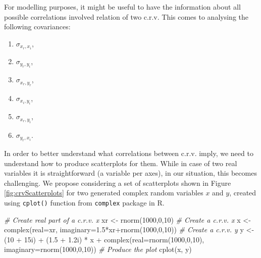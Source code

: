 \documentclass[
]{book}
\newenvironment{Shaded}{\begin{snugshade}}{\end{snugshade}}
\newcommand{\AttributeTok}[1]{\textcolor[rgb]{0.77,0.63,0.00}{#1}}
\newcommand{\CommentTok}[1]{\textcolor[rgb]{0.56,0.35,0.01}{\textit{#1}}}
\newcommand{\DecValTok}[1]{\textcolor[rgb]{0.00,0.00,0.81}{#1}}
\newcommand{\FloatTok}[1]{\textcolor[rgb]{0.00,0.00,0.81}{#1}}
\newcommand{\FunctionTok}[1]{\textcolor[rgb]{0.00,0.00,0.00}{#1}}
\newcommand{\NormalTok}[1]{#1}
\newcommand{\OtherTok}[1]{\textcolor[rgb]{0.56,0.35,0.01}{#1}}
\newcommand{\SpecialCharTok}[1]{\textcolor[rgb]{0.00,0.00,0.00}{#1}}
\providecommand{\tightlist}{%
  \setlength{\itemsep}{0pt}\setlength{\parskip}{0pt}}
\begin{document}
For modelling purposes, it might be useful to have the information about all possible correlations involved relation of two c.r.v. This comes to analysing the following covariances:

\begin{enumerate}
\def\labelenumi{\arabic{enumi}.}
\tightlist
\item
  \(\sigma_{x_r,x_i}\),
\item
  \(\sigma_{y_r,y_i}\),
\item
  \(\sigma_{x_r,y_r}\),
\item
  \(\sigma_{x_i,y_i}\),
\item
  \(\sigma_{x_r,y_i}\),
\item
  \(\sigma_{y_r,x_i}\).
\end{enumerate}

In order to better understand what correlations between c.r.v. imply, we need to understand how to produce scatterplots for them. While in case of two real variables it is straightforward (a variable per axes), in our situation, this becomes challenging. We propose considering a set of scatterplots shown in Figure \ref{fig:crvScatterplots} for two generated complex random variables \(x\) and \(y\), created using \texttt{cplot()} function from \texttt{complex} package in R.

\begin{Shaded}
\begin{Highlighting}[]
\CommentTok{\# Create real part of a c.r.v. x}
\NormalTok{xr }\OtherTok{\textless{}{-}} \FunctionTok{rnorm}\NormalTok{(}\DecValTok{1000}\NormalTok{,}\DecValTok{0}\NormalTok{,}\DecValTok{10}\NormalTok{)}
\CommentTok{\# Create a c.r.v. x}
\NormalTok{x }\OtherTok{\textless{}{-}} \FunctionTok{complex}\NormalTok{(}\AttributeTok{real=}\NormalTok{xr, }\AttributeTok{imaginary=}\FloatTok{1.5}\SpecialCharTok{*}\NormalTok{xr}\SpecialCharTok{+}\FunctionTok{rnorm}\NormalTok{(}\DecValTok{1000}\NormalTok{,}\DecValTok{0}\NormalTok{,}\DecValTok{10}\NormalTok{))}
\CommentTok{\# Create a c.r.v. y}
\NormalTok{y }\OtherTok{\textless{}{-}}\NormalTok{ (}\DecValTok{10} \SpecialCharTok{+}\NormalTok{ 15i) }\SpecialCharTok{+}\NormalTok{ (}\FloatTok{1.5} \SpecialCharTok{+} \FloatTok{1.2}\NormalTok{i) }\SpecialCharTok{*}\NormalTok{ x }\SpecialCharTok{+}
    \FunctionTok{complex}\NormalTok{(}\AttributeTok{real=}\FunctionTok{rnorm}\NormalTok{(}\DecValTok{1000}\NormalTok{,}\DecValTok{0}\NormalTok{,}\DecValTok{10}\NormalTok{), }\AttributeTok{imaginary=}\FunctionTok{rnorm}\NormalTok{(}\DecValTok{1000}\NormalTok{,}\DecValTok{0}\NormalTok{,}\DecValTok{10}\NormalTok{))}
\CommentTok{\# Produce the plot}
\FunctionTok{cplot}\NormalTok{(x, y)}
\end{Highlighting}
\end{Shaded}
\end{document}
